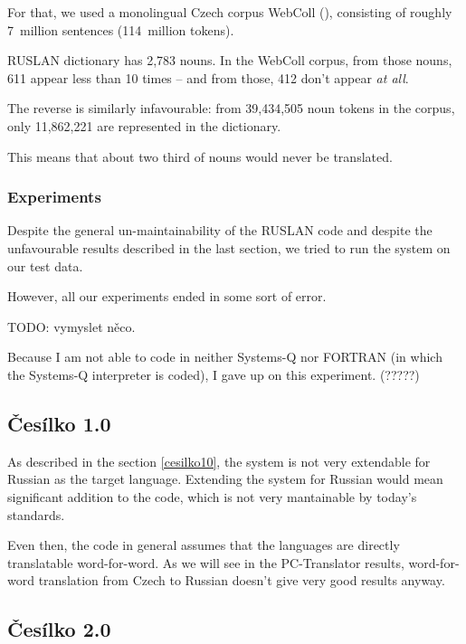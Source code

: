 For that, we used a monolingual Czech corpus WebColl (\cite{webcoll}), consisting of roughly 7~million sentences (114~million tokens).

RUSLAN dictionary has 2,783 nouns. In the WebColl corpus, from those nouns, 611 appear less than 10 times -- and from those, 412 don't appear \emph{at all}.

The reverse is similarly infavourable: from 39,434,505 noun tokens in the corpus, only 11,862,221 are represented in the dictionary.

This means that about two third of nouns would never be translated.

\subsubsection{Experiments}

Despite the general un-maintainability of the RUSLAN code and despite the unfavourable results described in the last section, we tried to run the system on our test data.

However, all our experiments ended in some sort of error.

TODO: vymyslet něco.

Because I am not able to code in neither Systems-Q nor FORTRAN (in which the Systems-Q interpreter is coded), I gave up on this experiment. (?????)

\subsection{Česílko 1.0}


As described in the section \ref{cesilko10}, the system is not very extendable for Russian as the target language. Extending the system for Russian would mean significant addition to the code, which is not very mantainable by today's standards. 

Even then, the code in general assumes that the languages are directly translatable word-for-word. As we will see in the PC-Translator results, word-for-word translation from Czech to Russian doesn't give very good results anyway.

\subsection{Česílko 2.0}

